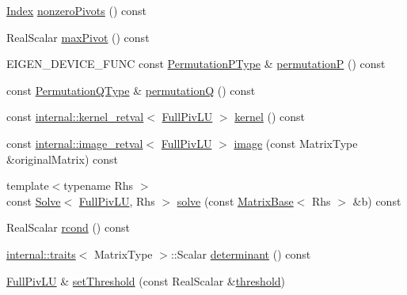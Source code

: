 \begin{DoxyCompactItemize}
\item 
\mbox{\hyperlink{struct_eigen_1_1_eigen_base_a554f30542cc2316add4b1ea0a492ff02}{Index}} \mbox{\hyperlink{class_eigen_1_1_full_piv_l_u_aa71132a751ad3c78178e33d6b2987400}{nonzero\+Pivots}} () const
\item 
Real\+Scalar \mbox{\hyperlink{class_eigen_1_1_full_piv_l_u_abced9f280f5fc49c2e62605c782b237b}{max\+Pivot}} () const
\item 
E\+I\+G\+E\+N\+\_\+\+D\+E\+V\+I\+C\+E\+\_\+\+F\+U\+NC const \mbox{\hyperlink{class_eigen_1_1_permutation_matrix}{Permutation\+P\+Type}} \& \mbox{\hyperlink{class_eigen_1_1_full_piv_l_u_a09274c82240f6441af5e6c99e24e756d}{permutationP}} () const
\item 
const \mbox{\hyperlink{class_eigen_1_1_permutation_matrix}{Permutation\+Q\+Type}} \& \mbox{\hyperlink{class_eigen_1_1_full_piv_l_u_a8d18190c7618de271cba7293f0493a36}{permutationQ}} () const
\item 
const \mbox{\hyperlink{struct_eigen_1_1internal_1_1kernel__retval}{internal\+::kernel\+\_\+retval}}$<$ \mbox{\hyperlink{class_eigen_1_1_full_piv_l_u}{Full\+Piv\+LU}} $>$ \mbox{\hyperlink{class_eigen_1_1_full_piv_l_u_a70f52eeb2cd07dfbf790fce106fb4015}{kernel}} () const
\item 
const \mbox{\hyperlink{struct_eigen_1_1internal_1_1image__retval}{internal\+::image\+\_\+retval}}$<$ \mbox{\hyperlink{class_eigen_1_1_full_piv_l_u}{Full\+Piv\+LU}} $>$ \mbox{\hyperlink{class_eigen_1_1_full_piv_l_u_a0893985d2dab367baa6e57c6fd0c4956}{image}} (const Matrix\+Type \&original\+Matrix) const
\item 
{\footnotesize template$<$typename Rhs $>$ }\\const \mbox{\hyperlink{class_eigen_1_1_solve}{Solve}}$<$ \mbox{\hyperlink{class_eigen_1_1_full_piv_l_u}{Full\+Piv\+LU}}, Rhs $>$ \mbox{\hyperlink{class_eigen_1_1_full_piv_l_u_af563471f6f3283fd10779ef02dd0b748}{solve}} (const \mbox{\hyperlink{class_eigen_1_1_matrix_base}{Matrix\+Base}}$<$ Rhs $>$ \&b) const
\item 
Real\+Scalar \mbox{\hyperlink{class_eigen_1_1_full_piv_l_u_a0bc63f910960dc3e35acecc8442025b6}{rcond}} () const
\item 
\mbox{\hyperlink{struct_eigen_1_1internal_1_1traits}{internal\+::traits}}$<$ Matrix\+Type $>$\+::Scalar \mbox{\hyperlink{class_eigen_1_1_full_piv_l_u_a71654e5c60a26407ecccfaa5b34bb0aa}{determinant}} () const
\item 
\mbox{\hyperlink{class_eigen_1_1_full_piv_l_u}{Full\+Piv\+LU}} \& \mbox{\hyperlink{class_eigen_1_1_full_piv_l_u_a414592d82de98f5bd075965caf56d681}{set\+Threshold}} (const Real\+Scalar \&\mbox{\hyperlink{class_eigen_1_1_full_piv_l_u_ad77539203694f2d85ff7d11616e5a0a5}{threshold}})

\end{DoxyCompactItemize}
